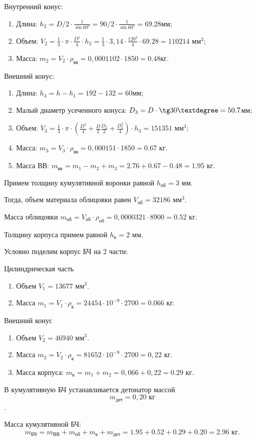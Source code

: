 Внутренний конус:
\begin{enumerate}
	\item Длина: 	$h_2=D/2 \cdot \frac{1}{\sin 60°}  =90/2 \cdot \frac{1}{\sin 60°}  =69.28 $мм;
	\item Объем:	$V_2=\frac{1}{3} \cdot \pi \cdot \frac{D^2}{4} \cdot h_2=\frac{1}{3} \cdot 3,14 \cdot  \frac{120^2}{4} \cdot 69.28=110214 \text{ мм}^3 $;
	\item Масса:	$m_2=V_2 \cdot \rho_\text{вв}=0,0001102 \cdot 1850=0.48 кг$.
\end{enumerate}

Внешний конус:
\begin{enumerate}
	\item Длина: 	$h_3=h-h_1=192-132=60 $мм;
	\item Малый диаметр усеченного конуса: $D_3=D \cdot \tg 30° =50.7 $мм;
	\item Объем:	$V_3=\frac{1}{3} \cdot \pi \cdot \left( \frac{D^2}{4}+\frac{D}{2}  \frac{D_2}{2}+ \frac{D_2^2}{4}\right) \cdot h_3=151351 \text{ мм}^3 $;
	\item Масса:	$m_3=V_3 \cdot \rho_\text{вв}=0,000151 \cdot 1850=0.67 $ кг.
	\item Масса ВВ: $m_\text{вв}=m_1-m_2+m_3=2.76 + 0.67 - 0.48=1.95$ кг.
\end{enumerate}

Примем толщину кумулятивной воронки равной 	$h_\text{об} = 3 $ мм.

Тогда, объем материала облицовки равен 		$V_\text{об} = 32186 \text{ мм}^3$.

Масса облицовки 	$m_\text{об}=V_\text{об} \cdot \rho_\text{об}=0,0000321 \cdot 8900=0.52 $ кг.

Толщину корпуса примем равной 	$h_\text{к} = 2 $ мм.

Условно поделим корпус БЧ на 2 части:

Цилиндрическая часть
\begin{enumerate}
 \item Объем $V_1 = 13677 \text{ мм}^3$.
 \item Масса $m_\text{1}=V_\text{1} \cdot \rho_\text{к}=24454 \cdot  10^{-9} \cdot 2700=0.066$  кг.
\end{enumerate}

\clearpage
Внешний конус
\begin{enumerate}
 \item Объем $V_2 = 46940 \text{ мм}^3$.
 \item Масса $m_2=V_2 \cdot \rho_\text{к}=81652 \cdot  10^{-9} \cdot 2700=0,22 $ кг.
 \item Масса корпуса: $m_\text{к}=m_\text{1}+m_2=0,066+0,22=0.29 $ кг.
\end{enumerate}

 В кумулятивную БЧ устанавливается детонатор массой $$m_\text{дет} = 0,20 \text{ кг}$$.

 Масса кумулятивной БЧ:
 $$m_\text{БЧ}=m_\text{ВВ}+m_\text{об}+m_\text{к}+m_\text{дет}=1.95 + 0.52 + 0.29 + 0.20=2.96 \text{ кг.}$$


